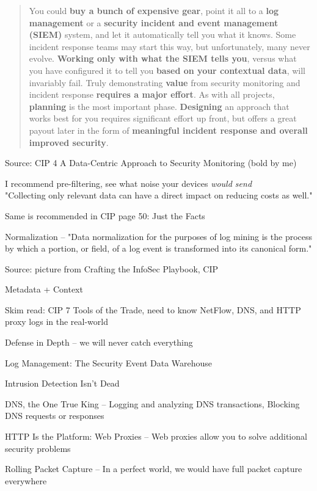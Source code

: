 \documentclass[Screen16to9,17pt]{foils}
\begin{document}


\begin{quote}\small
You could {\bf buy a bunch of expensive gear}, point it all to a {\bf log management} or a {\bf security incident and event management (SIEM)} system, and let it automatically tell you what it knows. Some incident response teams may start this way, but unfortunately, many never evolve. {\bf Working only with what the SIEM tells you}, versus what you have configured it to tell you {\bf based on your contextual data}, will invariably fail. Truly demonstrating {\bf value} from security monitoring and incident response {\bf requires a major effort}. As with all projects, {\bf planning} is the most important phase. {\bf Designing} an approach that works best for you requires significant effort up front, but offers a great payout later in the form of {\bf meaningful incident response and overall improved security}.
\end{quote}
Source: CIP 4 A Data-Centric Approach to Security Monitoring (bold by me)


\begin{list2}
\item I recommend pre-filtering, see what noise your devices \emph{would send}\\
"Collecting only relevant data can have a direct impact on reducing costs as well."
\item Same is recommended in CIP page 50: Just the Facts
\item Normalization -- "Data normalization for
the purposes of log mining is the process by which a portion, or field, of a log event is
transformed into its canonical form."
\end{list2}



Source: picture from Crafting the InfoSec Playbook, CIP

Metadata + Context


\begin{list1}
\item Skim read: CIP 7 Tools of the Trade, need to know NetFlow, DNS, and HTTP proxy logs in the real-world
\begin{list2}
\item Defense in Depth -- we will never catch everything
\item Log Management: The Security Event Data Warehouse
\item Intrusion Detection Isn’t Dead
\item DNS, the One True King -- Logging and analyzing DNS transactions, Blocking DNS requests or responses
\item HTTP Is the Platform: Web Proxies -- Web proxies allow you to solve additional security problems
\item Rolling Packet Capture -- In a perfect world, we would have full packet capture everywhere
\end{list2}
\end{list1}
\end{document}
